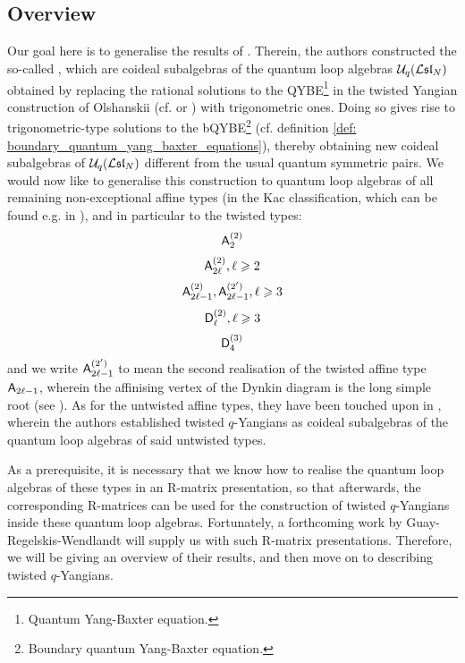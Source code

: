     \subsection{Overview}
        Our goal here is to generalise the results of \cite{molev_ragoucy_sorba_twisted_q_yangians_type_A}. Therein, the authors constructed the so-called , which are coideal subalgebras of the quantum loop algebras $\mathcal{U}_q(\mathcal{L}\mathfrak{sl}_N)$ obtained by replacing the rational solutions to the QYBE\footnote{Quantum Yang-Baxter equation.} in the twisted Yangian construction of Olshanskii (cf. \cite{olshanski_twisted_yangians_and_infinite_dimensional_classical_lie_algebras} or \cite[Chapter 2]{molev_yangians_and_classical_lie_algebras}) with trigonometric ones. Doing so gives rise to trigonometric-type solutions to the bQYBE\footnote{Boundary quantum Yang-Baxter equation.} (cf. definition \ref{def: boundary_quantum_yang_baxter_equations}), thereby obtaining new coideal subalgebras of $\mathcal{U}_q(\mathcal{L}\mathfrak{sl}_N)$ different from the usual quantum symmetric pairs. We would now like to generalise this construction to quantum loop algebras of all remaining non-exceptional affine types (in the Kac classification, which can be found e.g. in \cite[Chapter 4]{kac_infinite_dimensional_lie_algebras}), and in particular to the twisted types:
            $$\mathsf{A}_2^{(2)}$$
            $$\mathsf{A}_{2\ell}^{(2)}, \ell \geqslant 2$$
            $$\mathsf{A}_{2\ell - 1}^{(2)}, \mathsf{A}_{2\ell - 1}^{(2')}, \ell \geqslant 3$$
            $$\mathsf{D}_{\ell}^{(2)}, \ell \geqslant 3$$
            $$\mathsf{D}_4^{(3)}$$
        and we write $\mathsf{A}_{2\ell - 1}^{(2')}$ to mean the second realisation of the twisted affine type $\mathsf{A}_{2\ell - 1}$, wherein the affinising vertex of the Dynkin diagram is the long simple root (see \cite[Chapter 4, Tables Aff 2 and 3, p. 55]{kac_infinite_dimensional_lie_algebras}). As for the untwisted affine types, they have been touched upon in \cite{regelskis_vlaar_reflection_matrices_coideal_subalgebras}, wherein the authors established twisted $q$-Yangians as coideal subalgebras of the quantum loop algebras of said untwisted types.  
        
        As a prerequisite, it is necessary that we know how to realise the quantum loop algebras of these types in an R-matrix presentation, so that afterwards, the corresponding R-matrices can be used for the construction of twisted $q$-Yangians inside these quantum loop algebras. Fortunately, a forthcoming work by Guay-Regelskis-Wendlandt will supply us with such R-matrix presentations. Therefore, we will be giving an overview of their results, and then move on to describing twisted $q$-Yangians.

